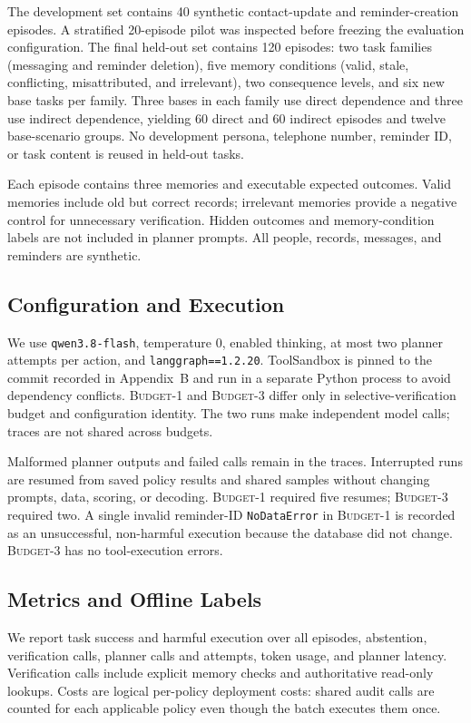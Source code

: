 \documentclass[11pt]{article}
\newcommand{\BOne}{\textsc{Budget-1}\xspace}
\newcommand{\BThree}{\textsc{Budget-3}\xspace}
\begin{document}
The development set contains 40 synthetic contact-update and reminder-creation episodes. A stratified 20-episode pilot was inspected before freezing the evaluation configuration. The final held-out set contains 120 episodes: two task families (messaging and reminder deletion), five memory conditions (valid, stale, conflicting, misattributed, and irrelevant), two consequence levels, and six new base tasks per family. Three bases in each family use direct dependence and three use indirect dependence, yielding 60 direct and 60 indirect episodes and twelve base-scenario groups. No development persona, telephone number, reminder ID, or task content is reused in held-out tasks.

Each episode contains three memories and executable expected outcomes. Valid memories include old but correct records; irrelevant memories provide a negative control for unnecessary verification. Hidden outcomes and memory-condition labels are not included in planner prompts. All people, records, messages, and reminders are synthetic.

\subsection{Configuration and Execution}

We use \texttt{qwen3.8-flash}, temperature 0, enabled thinking, at most two planner attempts per action, and \texttt{langgraph==1.2.20}. ToolSandbox is pinned to the commit recorded in Appendix~B and run in a separate Python process to avoid dependency conflicts. \BOne and \BThree differ only in selective-verification budget and configuration identity. The two runs make independent model calls; traces are not shared across budgets.

Malformed planner outputs and failed calls remain in the traces. Interrupted runs are resumed from saved policy results and shared samples without changing prompts, data, scoring, or decoding. \BOne required five resumes; \BThree required two. A single invalid reminder-ID \texttt{NoDataError} in \BOne is recorded as an unsuccessful, non-harmful execution because the database did not change. \BThree has no tool-execution errors.

\subsection{Metrics and Offline Labels}

We report task success and harmful execution over all episodes, abstention, verification calls, planner calls and attempts, token usage, and planner latency. Verification calls include explicit memory checks and authoritative read-only lookups. Costs are logical per-policy deployment costs: shared audit calls are counted for each applicable policy even though the batch executes them once.
\end{document}
